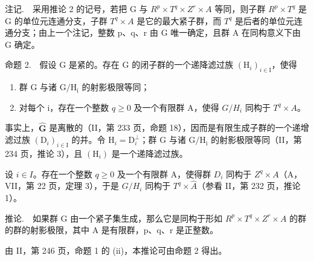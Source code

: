 注记.　采用推论 2 的记号，若把 G 与 \(R^{p} \times T^{q} \times Z^{r} \times A\) 等同，则子群 \(R^{p} \times T^{q}\) 是 G 的单位元连通分支，子群 \(T^{q} \times A\) 是它的最大紧子群，而 \(T^{q}\) 是后者的单位元连通分支；由上一个注记，整数 p、q、r 由 G 唯一确定，且群 A 在同构意义下由 G 确定。

命题 2.　假设 G 是紧的。存在 G 的闭子群的一个递降滤过族 \((\mathrm{H}_{i})_{i\in\mathrm{I}}\)，使得

\begin{enumerate}
\def\labelenumi{\alph{enumi})}
\item
  群 G 与诸 \(\mathrm{G / H_i}\) 的射影极限等同；
\item
  对每个 i，存在一个整数 \(q \geqslant 0\) 及一个有限群 A，使得 \(G/H_{i}\) 同构于 \(T^{q} \times A\)。
\end{enumerate}

事实上，\(\widehat{\mathbf{G}}\) 是离散的（II，第 233 页，命题 18），因而是有限生成子群的一个递增滤过族 \((\mathrm{D}_i)_{i\in \mathrm{I}}\) 的并。令 \(\mathrm{H}_i = \mathrm{D}_i^\perp\)；群 G 与诸 \(\mathrm{G / H_i}\) 的射影极限等同（II，第 234 页，推论 3），且 \((\mathrm{H}_i)\) 是一个递降滤过族。

设 \(i \in I\)。存在一个整数 \(q \geqslant 0\) 及一个有限群 A，使得群 \(D_{i}\) 同构于 \(Z^{q} \times A\)（A，VII，第 22 页，定理 3），于是 \(G/H_{i}\) 同构于 \(T^{q} \times \widehat{A}\)（参看 II，第 232 页，推论 1）。

推论.　如果群 G 由一个紧子集生成，那么它是同构于形如 \(R^{p} \times T^{q} \times Z^{r} \times A\) 的群的群的射影极限，其中 A 是有限群，p、q、r 是正整数。

由 II，第 246 页，命题 1 的 (ii)，本推论可由命题 2 得出。

